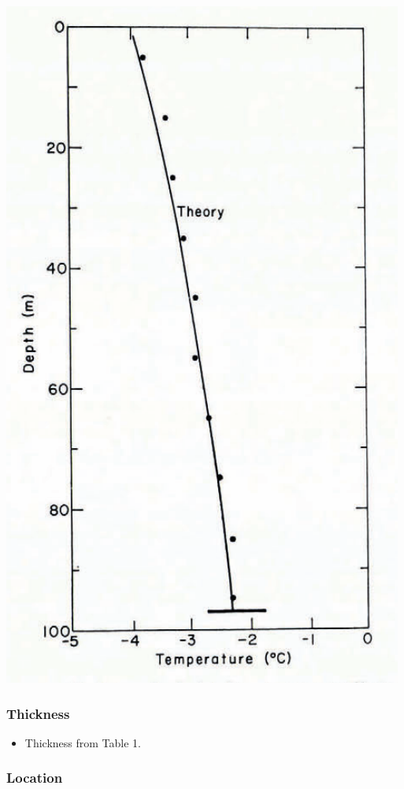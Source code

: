 \documentclass[article,a4paper,times,11pt,twoside]{article}
\begin{document}
\begin{center}
\includegraphics[width=.9\linewidth]{isua_10/isua_10.png}
\end{center}

\subsubsection{Thickness}
\label{sec:org273dedc}

\begin{itemize}
\item Thickness from \textcite{colbeck_1979} Table 1.
\end{itemize}

\subsubsection{Location}
\label{sec:orgfd6417c}
\end{document}
